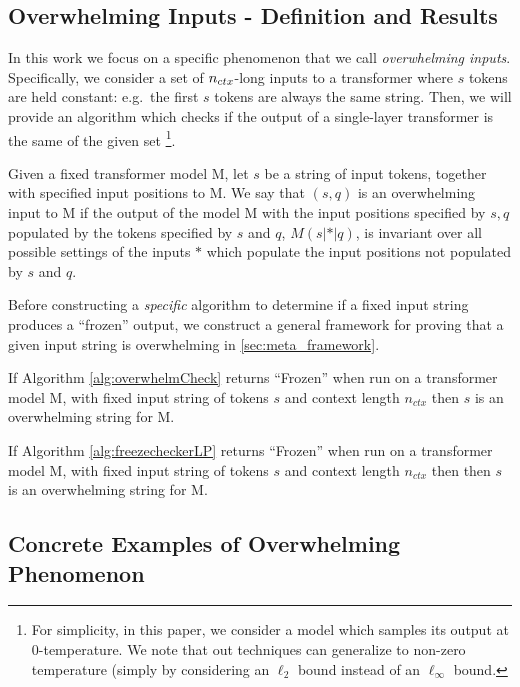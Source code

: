 \subsection{Overwhelming Inputs - Definition and Results} \label{subsec:Overconcepts}

In this work we focus on a specific phenomenon that we call \emph{overwhelming inputs}.
Specifically, we consider a set of ${n_{ctx}}$-long inputs to a transformer where $s$ tokens are held constant: e.g.\ the first $s$ tokens are always the same string. 
Then, we will provide an algorithm which checks if the output of a single-layer transformer is the same of the given set
\footnote{
	For simplicity, in this paper, we consider a model which samples its output at $0$-temperature.
	We note that out techniques can generalize to non-zero temperature (simply by considering an $\ell_2$ bound instead of an $\ell_\infty$ bound.
}.

\begin{definition}
	Given a fixed transformer model M, let $s$ be a string of input tokens, together with specified input positions to M.  We say that $(s, q)$ is an overwhelming input to M if the output of the model M with the input positions specified by $s, q$ populated by the tokens specified by $s$ and $q$, $M(s|*|q)$, is invariant over all possible settings of the inputs $*$ which populate the input positions not populated by $s$ and $q$.    
\end{definition}

Before constructing a \emph{specific} algorithm to determine if a fixed input string produces a ``frozen'' output, we construct a general framework for proving that a given input string is overwhelming in \cref{sec:meta_framework}.

\begin{theorem}
	If Algorithm \ref{alg:overwhelmCheck} returns ``Frozen'' when run on a transformer model M, with fixed input string of tokens $s$ and context length $n_{ctx}$ then $s$ is an overwhelming string for M.
\end{theorem}

\begin{theorem}
	If Algorithm \ref{alg:freezecheckerLP} returns ``Frozen'' when run on a transformer model M, with fixed input string of tokens $s$ and context length $n_{ctx}$ then then $s$ is an overwhelming string for M.
\end{theorem}

\subsection{Concrete Examples of Overwhelming Phenomenon}

\fi
